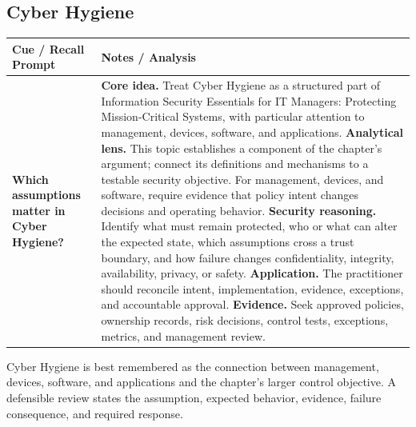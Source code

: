 \documentclass[11pt]{article}
\newcommand{\CornellHeader}{%
\rowcolor{Navy}\color{white}\bfseries Cue / Recall Prompt & \color{white}\bfseries Notes / Analysis\\\hline}
\newcommand{\CornellRow}[2]{%
\cellcolor{CueGray}\RaggedRight\textbf{#1} & \RaggedRight #2\\\hline}
\begin{document}
\subsection*{Cyber Hygiene}
\begin{longtable}{>{\RaggedRight\arraybackslash}p{}|>{\RaggedRight\arraybackslash}p{}}
\CornellHeader
\CornellRow{Which assumptions matter in Cyber Hygiene?}{\textbf{Core idea.} Treat Cyber Hygiene as a structured part of Information Security Essentials for IT Managers: Protecting Mission-Critical Systems, with particular attention to management, devices, software, and applications. \textbf{Analytical lens.} This topic establishes a component of the chapter's argument; connect its definitions and mechanisms to a testable security objective. For management, devices, and software, require evidence that policy intent changes decisions and operating behavior. \textbf{Security reasoning.} Identify what must remain protected, who or what can alter the expected state, which assumptions cross a trust boundary, and how failure changes confidentiality, integrity, availability, privacy, or safety. \textbf{Application.} The practitioner should reconcile intent, implementation, evidence, exceptions, and accountable approval. \textbf{Evidence.} Seek approved policies, ownership records, risk decisions, control tests, exceptions, metrics, and management review.}
\end{longtable}
\begin{topicsummary}
Cyber Hygiene is best remembered as the connection between management, devices, software, and applications and the chapter's larger control objective. A defensible review states the assumption, expected behavior, evidence, failure consequence, and required response.
\end{topicsummary}
\end{document}
